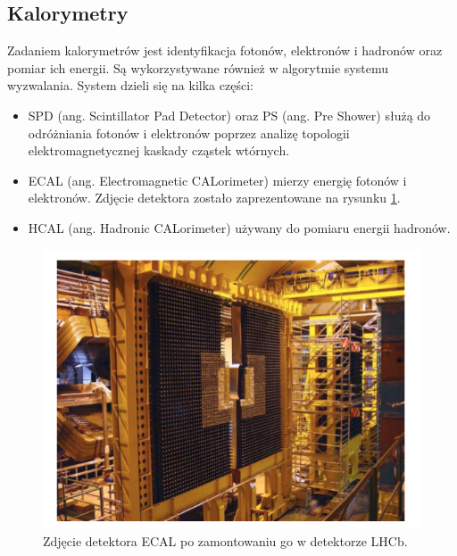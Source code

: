 \subsection{Kalorymetry}
Zadaniem  kalorymetrów jest identyfikacja fotonów, elektronów i hadronów oraz pomiar ich energii. Są wykorzystywane również w algorytmie systemu wyzwalania. System dzieli się na kilka części:
\begin{itemize}
\item SPD (ang. Scintillator Pad Detector) oraz PS (ang. Pre Shower) służą do odróżniania fotonów i elektronów poprzez analizę topologii elektromagnetycznej kaskady cząstek wtórnych.
\item ECAL (ang. Electromagnetic CALorimeter) mierzy energię fotonów i elektronów. Zdjęcie detektora zostało zaprezentowane na rysunku \ref{fig:ECAl}.
\item HCAL (ang. Hadronic CALorimeter) używany do pomiaru energii hadronów.
\end{itemize}
\begin{figure}[th] 
  \centering
  \includegraphics[scale=0.7]{rozdzial2/ECAL.png}
  \caption{Zdjęcie detektora ECAL po zamontowaniu go w detektorze LHCb.}
  \label{fig:ECAl}
\end{figure}



